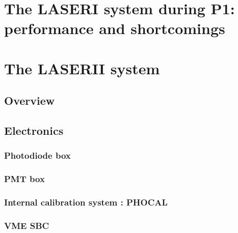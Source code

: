 \documentclass[UKenglish,texlive=2013]{\ATLASLATEXPATH atlasdoc}
\begin{document}
\section{The LASERI system during P1: performance and shortcomings}
\label{sec:detector}



\section{The LASERII system}
\label{sec:result}

\subsection{Overview}



\subsection{Electronics}

\subsubsection{Photodiode box}
\label{photodiodebox}



\subsubsection{PMT box}
\label{pmtbox}



\subsubsection{Internal calibration system : PHOCAL}



\subsubsection{VME SBC}


\end{document}
